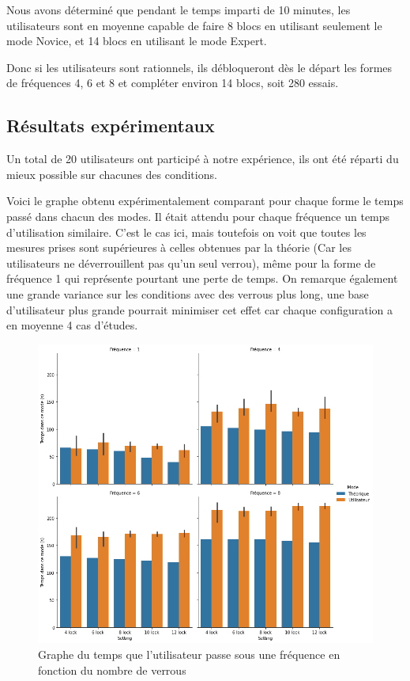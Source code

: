 \documentclass[a4paper, 12pt]{report}
\begin{document}
        Nous avons déterminé que pendant le temps imparti de 10 minutes, les utilisateurs sont en moyenne
        capable de faire 8 blocs en utilisant seulement le mode Novice, et 14 blocs en utilisant
        le mode Expert.
        
        Donc si les utilisateurs sont rationnels, ils débloqueront dès le départ les formes de 
        fréquences 4, 6 et 8 et compléter environ 14 blocs, soit 280 essais.
        
        \subsection{Résultats expérimentaux}
        Un total de 20 utilisateurs ont participé à notre expérience, ils ont été réparti du mieux 
        possible sur chacunes des conditions.
        
        Voici le graphe obtenu expérimentalement comparant pour chaque forme le temps passé dans chacun
        des modes. Il était attendu pour chaque fréquence un temps d'utilisation similaire. 
        C'est le cas ici, mais toutefois on voit que toutes les mesures prises sont supérieures à 
        celles obtenues par la théorie (Car les utilisateurs ne déverrouillent pas qu'un seul verrou), 
        même pour la forme de fréquence 1 qui représente pourtant une perte de temps. 
        On remarque également une grande variance sur les conditions avec des verrous plus long, une 
        base d'utilisateur plus grande pourrait minimiser cet effet car chaque configuration 
        a en moyenne 4 cas d'études.
        
        \begin{figure}[H]
            \centering
            \includegraphics[width=1\textwidth]{img/fig7.png}
            \caption{Graphe du temps que l'utilisateur passe sous une fréquence en fonction du nombre de verrous}
        \end{figure}
        
\end{document}

